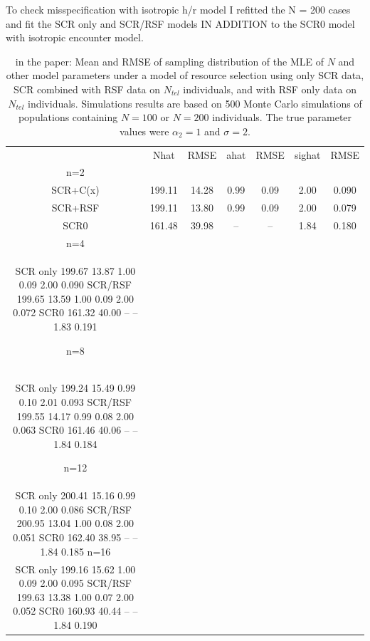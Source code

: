 \begin{table}[ht]
\centering
\caption{To check misspecification with isotropic h/r model I refitted the N =
200 cases and fit the SCR only and SCR/RSF models IN ADDITION to the
SCR0 model with isotropic encounter model.}
\caption{in the paper:
Mean and RMSE of sampling distribution of the MLE of $N$ and
  other model parameters under a model of resource selection using
  only SCR data, SCR combined with RSF data on $N_{tel}$ individuals,
  and with RSF only data on $N_{tel}$ individuals. Simulations results
  are based on 500 Monte Carlo simulations of populations containing
  $N=100$ or $N=200$ individuals. The true parameter values were
  $\alpha_{2} = 1$ and $\sigma = 2$.
}
\begin{tabular}{ccccccc}
        &  Nhat &RMSE   &  ahat &RMSE  & sighat & RMSE    \\
n=2     &       &       &       &      &        &         \\
SCR+C(x)& 199.11&  14.28&  0.99 &  0.09&   2.00 &  0.090  \\
SCR+RSF & 199.11&  13.80&  0.99 &  0.09&   2.00 &  0.079  \\
SCR0    & 161.48&  39.98&   --  &   -- &   1.84 &  0.180  \\
n=4   &       &      &        &    &        &          \\
SCR only 199.67  13.87   1.00   0.09   2.00   0.090
SCR/RSF  199.65  13.59   1.00   0.09   2.00   0.072
SCR0     161.32  40.00    --     --    1.83   0.191

n=8    &       &      &        &    &        &          \\
SCR only 199.24  15.49   0.99   0.10   2.01   0.093
SCR/RSF  199.55  14.17   0.99   0.08   2.00   0.063
SCR0     161.46  40.06    --     --    1.84   0.184

n=12    &       &      &        &    &        &          \\
SCR only 200.41  15.16   0.99   0.10   2.00   0.086
SCR/RSF  200.95  13.04   1.00   0.08   2.00   0.051
SCR0     162.40  38.95    --     --    1.84   0.185
n=16     &       &      &        &    &        &          \\
SCR only 199.16  15.62   1.00   0.09   2.00   0.095
SCR/RSF  199.63  13.38   1.00   0.07   2.00   0.052
SCR0     160.93  40.44    --     --    1.84   0.190
\end{tabular}
\end{table}





